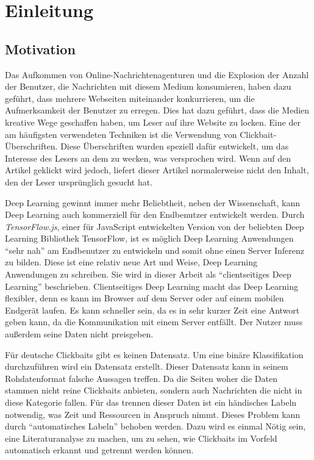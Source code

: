 \chapter{Einleitung}\label{ch1}

\section{Motivation}

Das Aufkommen von Online-Nachrichtenagenturen und die Explosion der Anzahl der Benutzer, die Nachrichten mit diesem Medium konsumieren, haben dazu geführt, dass mehrere Webseiten miteinander konkurrieren, um die Aufmerksamkeit der Benutzer zu erregen. Dies hat dazu geführt, dass die Medien kreative Wege geschaffen haben, um Leser auf ihre Website zu locken. Eine der am häufigsten verwendeten Techniken ist die Verwendung von Clickbait-Überschriften. Diese Überschriften wurden speziell dafür entwickelt, um das Interesse des Lesers an dem zu wecken, was versprochen wird. Wenn auf den Artikel geklickt wird jedoch, liefert dieser Artikel normalerweise nicht den Inhalt, den der Leser ursprünglich gesucht hat. 


Deep Learning gewinnt immer mehr Beliebtheit, neben der Wissenschaft, kann Deep Learning auch kommerziell für den Endbenutzer entwickelt werden. Durch \textit{TensorFlow.js}, einer für JavaScript entwickelten Version von der beliebten Deep Learning Bibliothek TensorFlow, ist es möglich Deep Learning Anwendungen \enquote{sehr nah} am Endbenutzer zu entwickeln und somit ohne einen Server Inferenz zu bilden. Diese ist eine relativ neue Art und Weise, Deep Learning Anwendungen zu schreiben. Sie wird in dieser Arbeit als \enquote{clientseitiges Deep Learning} beschrieben. Clientseitiges Deep Learning macht das Deep Learning flexibler, denn es kann im Browser auf dem Server oder auf einem mobilen Endgerät laufen. Es kann schneller sein, da es in sehr kurzer Zeit eine Antwort geben kann, da die Kommunikation mit einem Server entfällt. Der Nutzer muss außerdem seine Daten nicht preisgeben.

Für deutsche Clickbaits gibt es keinen Datensatz. Um eine binäre Klassifikation durchzuführen wird ein Datensatz erstellt. Dieser Datensatz kann in seinem Rohdatenformat falsche Aussagen treffen. Da die Seiten woher die Daten stammen nicht reine Clickbaits anbieten, sondern auch Nachrichten die nicht in diese Kategorie fallen. Für das trennen dieser Daten ist ein händisches Labeln notwendig, was Zeit und Ressourcen in Anspruch nimmt. Dieses Problem kann durch \enquote{automatisches Labeln} behoben werden. Dazu wird es einmal Nötig sein, eine Literaturanalyse zu machen, um zu sehen, wie Clickbaits im Vorfeld automatisch erkannt und getrennt werden können.


